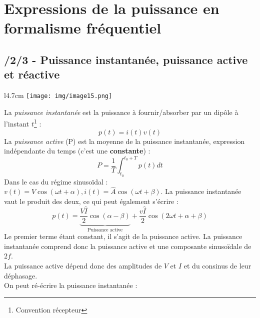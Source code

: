 \documentclass	[11pt, a4paper, openany]{book}
\begin{document}
		      \section{Expressions de la puissance en formalisme fréquentiel}
		      \subsection{/2/3 - Puissance instantanée, puissance active et réactive}
		      \begin{wrapfigure}[7]{l}{4.7cm}
		      	\texttt{[image: img/image15.png]}
		      \end{wrapfigure}
		      La \textit{puissance instantanée} est la puissance à fournir/absorber par un dipôle à l'instant $t$\footnote{Convention récepteur} :
		      \begin{equation}
		      	p(t) = i(t)v(t)
		      \end{equation}
		      La \textit{puissance active} (P) est la moyenne de la puissance instantanée, expression indépendante du temps (c'est une \textbf{constante}) :
		      \begin{equation}
		      	P = \frac{1}{T}\int_{t_0}^{t_0+T} p(t) dt
		      \end{equation}
		      Dans le cas du régime sinusoïdal : $v(t) = V\cos(\omega t + \alpha), i(t) = \hat A\cos(\omega t + \beta)$. La puissance instantanée vaut le produit des deux, ce qui peut également s'écrire :
		      \begin{equation}
		      	p(t) = \underbrace{\frac{V\hat I}{2}\cos(\alpha - \beta)}_{\text{Puissance active}} + \frac{v\hat I}{2}\cos(2\omega t + \alpha + \beta)
		      \end{equation}
		      Le premier terme étant constant, il s'agit de la puissance active. La puissance instantanée comprend donc la puissance active et une composante sinusoïdale de $2f$.\\
		      La puissance active dépend donc des amplitudes de $V$ et $I$ et du consinus de leur déphasage.\\
		      
		      On peut ré-écrire la puissance instantanée : 
		      
		      
		      
		      
		      
\end{document}
